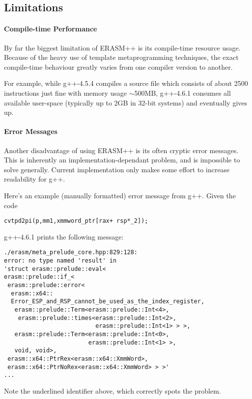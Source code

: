 \documentclass{article}
\begin{document}
\subsection{Limitations}
\label{sec:erasm-limitations}

\paragraph{Compile-time Performance}
\label{sec:comp-time-perf}

By far the biggest limitation of ERASM++ is its compile-time resource
usage. Because of the heavy use of template metaprogramming
techniques, the exact compile-time behaviour greatly varies from one
compiler version to another.

For example, while g++-4.5.4 compiles a source file which consists of
about 2500 instructions just fine with memory usage $\sim$500MB,
g++-4.6.1 consumes all available user-space (typically up to 2GB in
32-bit systems) and eventually gives up.

\paragraph{Error Messages}
\label{sec:error-messages}

Another disadvantage of using ERASM++ is its often cryptic error
messages.  This is inherently an implementation-dependant problem, and
is impossible to solve generally. Current implementation only makes
some effort to increase readability for g++.

Here's an example (manually formatted) error message from
g++. Given the code
\begin{lstlisting}[frame=single]
cvtpd2pi(p,mm1,xmmword_ptr[rax+ rsp*_2]);  
\end{lstlisting}
g++-4.6.1 prints the following message:
\begin{lstlisting}[emph={Error_ESP_and_RSP_cannot_be_used_as_the_index_register},emphstyle=\underbar]
./erasm/meta_prelude_core.hpp:829:128: 
error: no type named 'result' in 
'struct erasm::prelude::eval<
erasm::prelude::if_<
 erasm::prelude::error<
  erasm::x64::
  Error_ESP_and_RSP_cannot_be_used_as_the_index_register,
   erasm::prelude::Term<erasm::prelude::Int<4>, 
    erasm::prelude::times<erasm::prelude::Int<2>,
                          erasm::prelude::Int<1> > >,
   erasm::prelude::Term<erasm::prelude::Int<0>, 
                        erasm::prelude::Int<1> >,
   void, void>, 
 erasm::x64::PtrRex<erasm::x64::XmmWord>, 
 erasm::x64::PtrNoRex<erasm::x64::XmmWord> > >'
...
\end{lstlisting}
Note the underlined identifier above, which correctly spots the problem.
\end{document}

